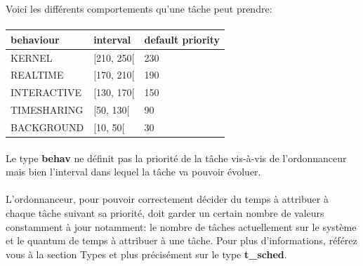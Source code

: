\documentclass[10pt,a4wide]{article}
\begin{document}
Voici les diff\'erents comportements qu'une t\^ache peut prendre:

\paragraph{}

\begin{center}

\begin{tabular}{|p{4cm}|p{4cm}|p{4cm}|}

\hline

\textbf{behaviour}	& \textbf{interval}	& \textbf{default priority} \\

\hline

KERNEL			& [210, 250[		& 230 \\

\hline

REALTIME		& [170, 210[		& 190 \\

\hline

INTERACTIVE		& [130, 170[		& 150 \\

\hline

TIMESHARING		& [50, 130[		& 90 \\

\hline

BACKGROUND		& [10, 50[		& 30 \\

\hline

\end{tabular}

\end{center}

\paragraph{}

Le type \textbf{behav} ne d\'efinit pas la priorit\'e de la t\^ache vis-\`a-vis
de l'ordonnanceur mais bien l'interval dans lequel la t\^ache va pouvoir
\'evoluer.

\paragraph{}

L'ordonnanceur, pour pouvoir correctement d\'ecider du temps \`a attribuer \`a
chaque t\^ache suivant sa priorit\'e, doit garder un certain nombre de
valeurs constamment \`a jour notamment: le nombre de t\^aches actuellement
sur le syst\`eme et le quantum de temps \`a attribuer \`a une t\^ache.
Pour plus d'informations, r\'ef\'erez vous \`a la section Types et plus
pr\'ecis\'ement sur le type \textbf{t\_sched}.
\end{document}
